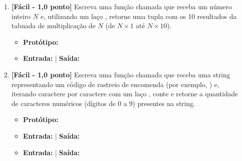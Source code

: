 \begin{enumerate}[label=\textbf{Q\arabic*.}, start=25]
\begin{itemize}[leftmargin=*]
    \item \textbf{Protótipo:}\newline {}
    \item \textbf{Entrada:}  | \textbf{Saída:} 
    \item \textbf{Entrada:}  | \textbf{Saída:} 
\end{itemize}



\vspace{0.4cm}

\item \textbf{[Fácil - 1,0 ponto]} Escreva uma função chamada  que receba um número inteiro $N$ e, utilizando um laço , retorne uma tupla com os 10 resultados da tabuada de multiplicação de $N$ (de $N \times 1$ até $N \times 10$).

\begin{itemize}[leftmargin=*]
    \item \textbf{Protótipo:}\newline {}\\
    \item \textbf{Entrada:}  | \textbf{Saída:} 
\end{itemize}



\vspace{0.4cm}

\item \textbf{[Fácil - 1,0 ponto]} Escreva uma função chamada  que receba uma string representando um código de rastreio de encomenda (por exemplo, ) e, iterando caractere por caractere com um laço , conte e retorne a quantidade de caracteres numéricos (dígitos de 0 a 9) presentes na string.

\begin{itemize}[leftmargin=*]
    \item \textbf{Protótipo:}\newline {}
    \item \textbf{Entrada:}  | \textbf{Saída:} 
    \item \textbf{Entrada:}  | \textbf{Saída:} 
\end{itemize}


\end{enumerate}
